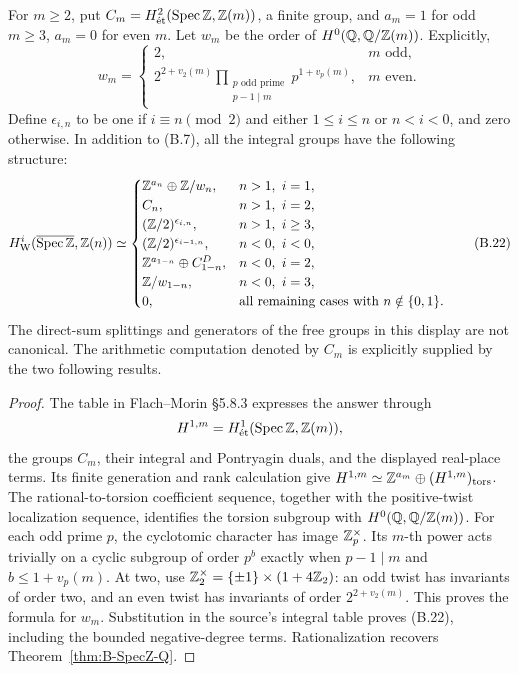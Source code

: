 \begin{proposition}
\label{prop:B-integral-structure}
For \(m\ge2\), put
\(C_m=H^2_{\mathrm{\acute et}}(\operatorname{Spec}\mathbb Z,\mathbb Z(m))\), a finite group, and
\(a_m=1\) for odd \(m\ge3\), \(a_m=0\) for even \(m\).
Let \(w_m\) be the order of
\(H^0(\mathbb Q,\mathbb Q/\mathbb Z(m))\).  Explicitly,
\[
 w_m=\begin{cases}
 2,&m\text{ odd},\\
 2^{2+v_2(m)}\displaystyle\prod_{\substack{p\text{ odd prime}\\p-1\mid m}}
 p^{1+v_p(m)},&m\text{ even}.
 \end{cases}
\]
Define \(\epsilon_{i,n}\) to be one if
\(i\equiv n\pmod2\) and either \(1\le i\le n\) or
\(n<i<0\), and zero otherwise.  In addition to (B.7), all the
integral groups have the following structure:
\[
H^i_{\mathrm W}(\overline{\operatorname{Spec}\mathbb Z},\mathbb Z(n))\simeq
\begin{cases}
\mathbb Z^{a_n}\oplus\mathbb Z/w_n,&n>1,\ i=1,\\
C_n,&n>1,\ i=2,\\
(\mathbb Z/2)^{\epsilon_{i,n}},&n>1,\ i\ge3,\\
(\mathbb Z/2)^{\epsilon_{i-1,n}},&n<0,\ i<0,\\
\mathbb Z^{a_{1-n}}\oplus C_{1-n}^{D},&n<0,\ i=2,\\
\mathbb Z/w_{1-n},&n<0,\ i=3,\\
0,&\text{all remaining cases with }n\notin\{0,1\}.
\end{cases}\tag{B.22}
\]
The direct-sum splittings and generators of the free groups in this
display are not canonical.  The arithmetic computation denoted by \(C_m\) is explicitly
supplied by the two following results.
\end{proposition}
\begin{proof}
The table in Flach--Morin \S5.8.3 expresses the answer through
\[
 H^{1,m}=H^1_{\mathrm{\acute et}}(\operatorname{Spec}\mathbb Z,\mathbb Z(m)),
\]
the groups \(C_m\), their
integral and Pontryagin duals, and the displayed real-place terms.
Its finite generation and rank calculation give
\(H^{1,m}\simeq\mathbb Z^{a_m}\oplus(H^{1,m})_{\rm tors}\).
The rational-to-torsion coefficient sequence, together with the
positive-twist localization sequence, identifies the torsion subgroup
with \(H^0(\mathbb Q,\mathbb Q/\mathbb Z(m))\).  For each odd prime \(p\), the
cyclotomic character has image \(\mathbb Z_p^\times\).  Its \(m\)-th
power acts trivially on a cyclic subgroup of order \(p^b\) exactly
when \(p-1\mid m\) and \(b\le1+v_p(m)\).  At two, use
\(\mathbb Z_2^\times=\{\pm1\}\times(1+4\mathbb Z_2)\): an odd twist
has invariants of order two, and an even twist has invariants of
order \(2^{2+v_2(m)}\).  This proves the formula for \(w_m\).
Substitution in the source's integral table proves (B.22), including
the bounded negative-degree terms.  Rationalization recovers
Theorem~\ref{thm:B-SpecZ-Q}.
\end{proof}

